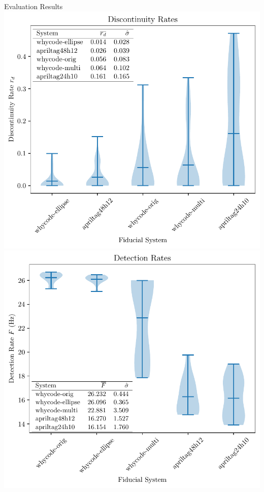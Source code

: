 \documentclass[aspectratio=169]{beamer}
\begin{document}
\begin{frame}{Evaluation Results}
    \centering
    \includegraphics[width=0.49\linewidth]{./images/violin_plot_five_member}
    \includegraphics[width=0.49\linewidth]{./images/violin_plot_speed_five_member}
\end{frame}
\end{document}
